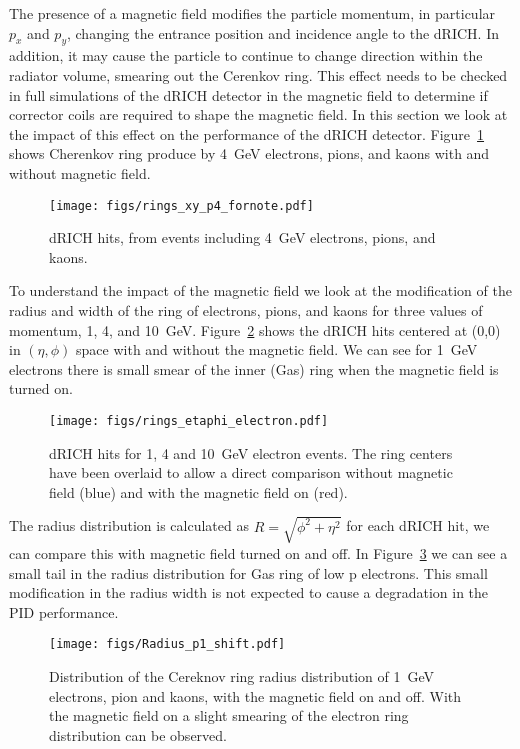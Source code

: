 The presence of a magnetic field modifies the particle momentum, in particular $p_{x}$ and $p_{y}$, changing the entrance position and incidence angle to the dRICH. In addition, it may cause the particle to continue to change direction within the radiator volume, smearing out the Cerenkov ring. This effect needs to be checked in full simulations of the dRICH detector in the magnetic field to determine if corrector coils are required to shape the magnetic field. In this section we look at the impact of this effect on the performance of the dRICH detector. Figure~\ref{fig:drich_p4_xy} shows Cherenkov ring produce by 4~GeV electrons, pions, and kaons with and without magnetic field. 
\begin{figure}[h!tbp]
    \centering
    \texttt{[image: figs/rings\_xy\_p4\_fornote.pdf]}
    \caption{dRICH hits, from events including 4~GeV electrons, pions, and kaons.}
    \label{fig:drich_p4_xy}
\end{figure}
To understand the impact of the magnetic field we look at the modification of the radius and width of the ring of electrons, pions, and kaons for three values of momentum, 1, 4, and 10~GeV. Figure~\ref{fig:drich_pX_e} shows the dRICH hits centered at (0,0) in $(\eta,\phi)$ space with and without the magnetic field. We can see for 1~GeV electrons there is small smear of the inner (Gas) ring when the magnetic field is turned on. 
\begin{figure}[h!tbp]
    \centering
    \texttt{[image: figs/rings\_etaphi\_electron.pdf]}
    \caption{dRICH hits for 1, 4 and 10~GeV electron events. The ring centers have been overlaid to allow a direct comparison without magnetic field (blue) and with the magnetic field on (red). }
    \label{fig:drich_pX_e}
\end{figure}
The radius distribution is calculated as $R=\sqrt{\phi^{2}+\eta^{2}}$ for each dRICH hit, we can compare this with magnetic field turned on and off. In Figure~\ref{fig:drich_radius_p1_ePiK} we can see a small tail in the radius distribution for Gas ring of low p electrons. This small modification in the radius width is not expected to cause a degradation in the PID performance.
\begin{figure}[h!tbp]
    \centering
    \texttt{[image: figs/Radius\_p1\_shift.pdf]}
    \caption{Distribution of the Cereknov ring radius distribution of 1~GeV electrons, pion and kaons, with the magnetic field on and off.  With the magnetic field on a slight smearing of the electron ring distribution can be observed. }
    \label{fig:drich_radius_p1_ePiK}
\end{figure}